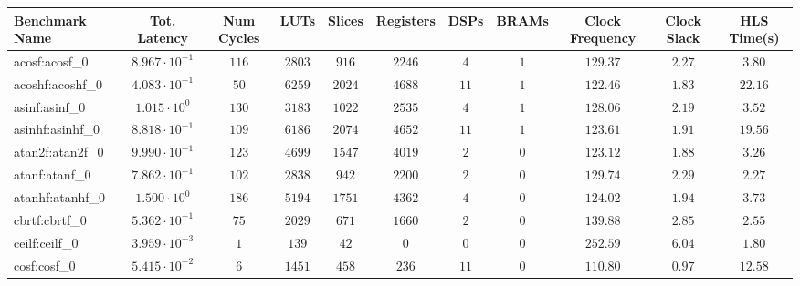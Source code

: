 \begin{tabular}{|l|c|c|c|c|c|c|c|c|c|c|}
\hline
Benchmark Name               & Tot. Latency            & Num Cycles & LUTs       & Slices    & Registers & DSPs    & BRAMs & Clock Frequency & Clock Slack & HLS Time(s) \\
\hline
acosf:acosf\_0               & $ 8.967 \cdot 10^{-1} $ & $ 116    $ & $ 2803   $ & $ 916   $ & $ 2246  $ & $ 4   $ & $ 1 $ & $ 129.37      $ & $ 2.27    $ & $ 3.80    $ \\
acoshf:acoshf\_0             & $ 4.083 \cdot 10^{-1} $ & $ 50     $ & $ 6259   $ & $ 2024  $ & $ 4688  $ & $ 11  $ & $ 1 $ & $ 122.46      $ & $ 1.83    $ & $ 22.16   $ \\
asinf:asinf\_0               & $ 1.015 \cdot 10^{0}  $ & $ 130    $ & $ 3183   $ & $ 1022  $ & $ 2535  $ & $ 4   $ & $ 1 $ & $ 128.06      $ & $ 2.19    $ & $ 3.52    $ \\
asinhf:asinhf\_0             & $ 8.818 \cdot 10^{-1} $ & $ 109    $ & $ 6186   $ & $ 2074  $ & $ 4652  $ & $ 11  $ & $ 1 $ & $ 123.61      $ & $ 1.91    $ & $ 19.56   $ \\
atan2f:atan2f\_0             & $ 9.990 \cdot 10^{-1} $ & $ 123    $ & $ 4699   $ & $ 1547  $ & $ 4019  $ & $ 2   $ & $ 0 $ & $ 123.12      $ & $ 1.88    $ & $ 3.26    $ \\
atanf:atanf\_0               & $ 7.862 \cdot 10^{-1} $ & $ 102    $ & $ 2838   $ & $ 942   $ & $ 2200  $ & $ 2   $ & $ 0 $ & $ 129.74      $ & $ 2.29    $ & $ 2.27    $ \\
atanhf:atanhf\_0             & $ 1.500 \cdot 10^{0}  $ & $ 186    $ & $ 5194   $ & $ 1751  $ & $ 4362  $ & $ 4   $ & $ 0 $ & $ 124.02      $ & $ 1.94    $ & $ 3.73    $ \\
cbrtf:cbrtf\_0               & $ 5.362 \cdot 10^{-1} $ & $ 75     $ & $ 2029   $ & $ 671   $ & $ 1660  $ & $ 2   $ & $ 0 $ & $ 139.88      $ & $ 2.85    $ & $ 2.55    $ \\
ceilf:ceilf\_0               & $ 3.959 \cdot 10^{-3} $ & $ 1      $ & $ 139    $ & $ 42    $ & $ 0     $ & $ 0   $ & $ 0 $ & $ 252.59      $ & $ 6.04    $ & $ 1.80    $ \\
cosf:cosf\_0                 & $ 5.415 \cdot 10^{-2} $ & $ 6      $ & $ 1451   $ & $ 458   $ & $ 236   $ & $ 11  $ & $ 0 $ & $ 110.80      $ & $ 0.97    $ & $ 12.58   $ \\

\end{tabular}
